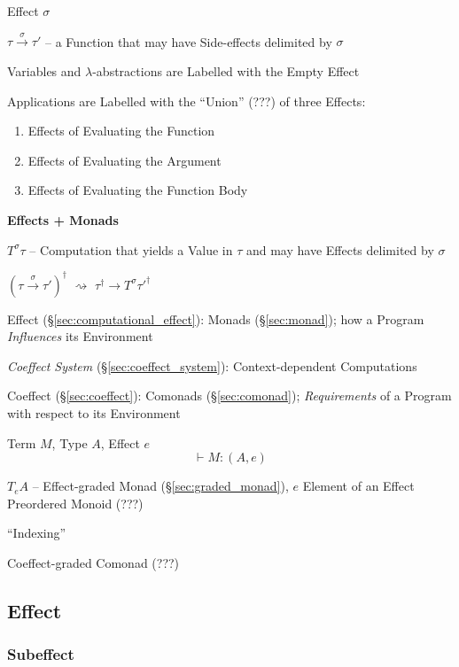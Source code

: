 Effect $\sigma$

$\tau \xrightarrow{\sigma} \tau'$ -- a Function that may have
Side-effects delimited by $\sigma$

Variables and $\lambda$-abstractions are Labelled with the Empty
Effect

Applications are Labelled with the ``Union'' (???) of three Effects:
\begin{enumerate}
  \item Effects of Evaluating the Function
  \item Effects of Evaluating the Argument
  \item Effects of Evaluating the Function Body
\end{enumerate}


\textbf{Effects + Monads}

$T^\sigma\tau$ -- Computation that yields a Value in $\tau$ and may
have Effects delimited by $\sigma$

$(\tau \xrightarrow{\sigma} \tau')^\dag$
$\rightsquigarrow$
$\tau^\dag \rightarrow T^\sigma \tau'^\dag$


\asterism


Effect (\S\ref{sec:computational_effect}): Monads (\S\ref{sec:monad});
how a Program \emph{Influences} its Environment

\emph{Coeffect System} (\S\ref{sec:coeffect_system}):
Context-dependent Computations

Coeffect (\S\ref{sec:coeffect}): Comonads (\S\ref{sec:comonad});
\emph{Requirements} of a Program with respect to its Environment

Term $M$, Type $A$, Effect $e$
\[
  \vdash M :(A,e)
\]

$T_e A$ -- Effect-graded Monad (\S\ref{sec:graded_monad}), $e$ Element
of an Effect Preordered Monoid (???)

``Indexing''

Coeffect-graded Comonad (???)



\subsection{Effect}\label{sec:effect}

\subsubsection{Subeffect}\label{sec:subeffect}

